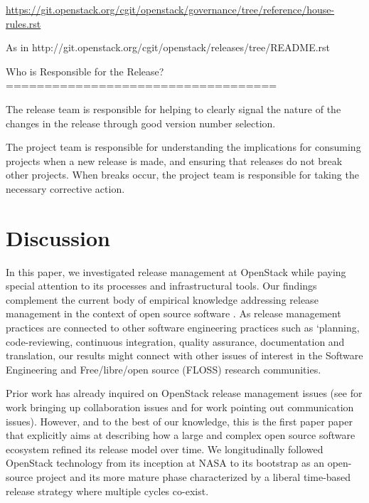 \documentclass[dvipsnames]{bmcart}
\theoremstyle{definition}
\begin{document}
{\url{https://git.openstack.org/cgit/openstack/governance/tree/reference/house-rules.rst}




As in http://git.openstack.org/cgit/openstack/releases/tree/README.rst

Who is Responsible for the Release?
===================================

The release team is responsible for helping to clearly signal the
nature of the changes in the release through good version number
selection.

The project team is responsible for understanding the implications for
consuming projects when a new release is made, and ensuring that
releases do not break other projects. When breaks occur, the project
team is responsible for taking the necessary corrective action.
}
{}


\section{Discussion}



In this paper, we investigated release management at OpenStack while paying special attention to its processes and infrastructural tools. Our findings complement the current body of empirical knowledge addressing release management in the context of open source software \cite{michlmayr2015and,Poo-Caamano2017}. As release management practices are connected to other software engineering practices such as `planning, code-reviewing, continuous integration, quality assurance, documentation and translation, our results might connect with other issues of interest in the Software Engineering and Free/libre/open source (FLOSS) research communities. 

Prior work has already inquired on OpenStack release management issues (see \cite[pp 10-11]{teixeira2015lessons} for work bringing up collaboration issues and \cite[pp 80-82]{poo2016release} for work pointing out communication issues). However, and to the best of our knowledge, this is the first paper paper that explicitly aims at describing how a large and complex open source software ecosystem refined its release model over time. We longitudinally followed OpenStack technology from its inception at NASA to its bootstrap as an open-source project and its more mature phase characterized by a liberal time-based release strategy where multiple cycles co-exist.
\end{document}
